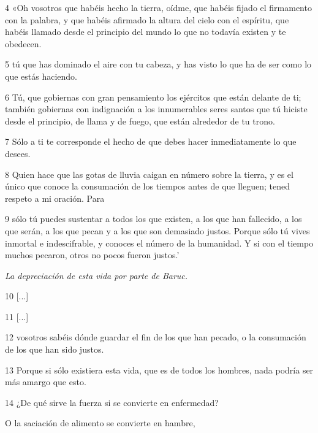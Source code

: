\par 4 «Oh vosotros que habéis hecho la tierra, oídme, que habéis fijado el firmamento con la palabra, y que habéis afirmado la altura del cielo con el espíritu, que habéis llamado desde el principio del mundo lo que no todavía existen y te obedecen.

\par 5 tú que has dominado el aire con tu cabeza, y has visto lo que ha de ser como lo que estás haciendo.

\par 6 Tú, que gobiernas con gran pensamiento los ejércitos que están delante de ti; también gobiernas con indignación a los innumerables seres santos que tú hiciste desde el principio, de llama y de fuego, que están alrededor de tu trono.

\par 7 Sólo a ti te corresponde el hecho de que debes hacer inmediatamente lo que desees.

\par 8 Quien hace que las gotas de lluvia caigan en número sobre la tierra, y es el único que conoce la consumación de los tiempos antes de que lleguen; tened respeto a mi oración. Para

\par 9 sólo tú puedes sustentar a todos los que existen, a los que han fallecido, a los que serán, a los que pecan y a los que son demasiado justos. Porque sólo tú vives inmortal e indescifrable, y conoces el número de la humanidad. Y si con el tiempo muchos pecaron, otros no pocos fueron justos.'

\par \textit{La depreciación de esta vida por parte de Baruc.}

\par 10 [...]

\par 11 [...]

\par 12 vosotros sabéis dónde guardar el fin de los que han pecado, o la consumación de los que han sido justos.

\par 13 Porque si sólo existiera esta vida, que es de todos los hombres, nada podría ser más amargo que esto.

\par 14 ¿De qué sirve la fuerza si se convierte en enfermedad?

\par O la saciación de alimento se convierte en hambre,

